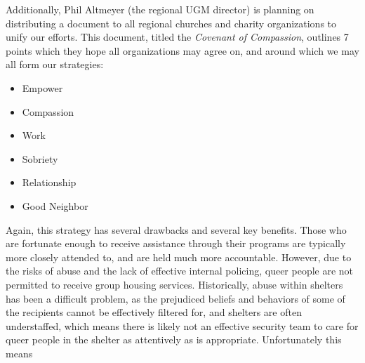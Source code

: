         \par Additionally, Phil Altmeyer (the regional UGM director) is planning on distributing a document to all regional churches and charity organizations to unify our efforts.
        This document, titled the \textit{Covenant of Compassion}, outlines 7 points which they hope all organizations may agree on, and around which we may all form our strategies:
        \begin{itemize}
            \item{Empower}
            \item{Compassion}
            \item{Work}
            \item{Sobriety}
            \item{Relationship}
            \item{Good Neighbor}
        \end{itemize}

        \par Again, this strategy has several drawbacks and several key benefits.
        Those who are fortunate enough to receive assistance through their programs are typically more closely attended to, and are held much more accountable.
        However, due to the risks of abuse and the lack of effective internal policing, queer people are not permitted to receive group housing services.
        Historically, abuse within shelters has been a difficult problem, as the prejudiced beliefs and behaviors of some of the recipients cannot be effectively filtered for, and shelters are often understaffed, which means there is likely not an effective security team to care for queer people in the shelter as attentively as is appropriate.
        Unfortunately this means 
